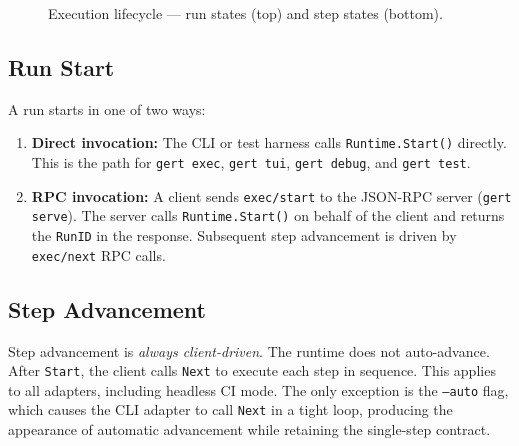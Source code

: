 \begin{figure}[htbp]

\caption{Execution lifecycle --- run states (top) and step states (bottom).}
\label{fig:execution-lifecycle}
\end{figure}

\subsection{Run Start}

A run starts in one of two ways:

\begin{enumerate}
  \item \textbf{Direct invocation:} The CLI or test harness calls \texttt{Runtime.Start()}
        directly. This is the path for \texttt{gert exec}, \texttt{gert tui}, \texttt{gert debug},
        and \texttt{gert test}.
  \item \textbf{RPC invocation:} A client sends \texttt{exec/start} to the JSON-RPC server
        (\texttt{gert serve}). The server calls \texttt{Runtime.Start()} on behalf of the
        client and returns the \texttt{RunID} in the response. Subsequent step advancement
        is driven by \texttt{exec/next} RPC calls.
\end{enumerate}

\subsection{Step Advancement}

Step advancement is \emph{always client-driven}. The runtime does not auto-advance.
After \texttt{Start}, the client calls \texttt{Next} to execute each step in sequence.
This applies to all adapters, including headless CI mode. The only exception is the
\texttt{--auto} flag, which causes the CLI adapter to call \texttt{Next} in a tight loop,
producing the appearance of automatic advancement while retaining the single-step contract.

